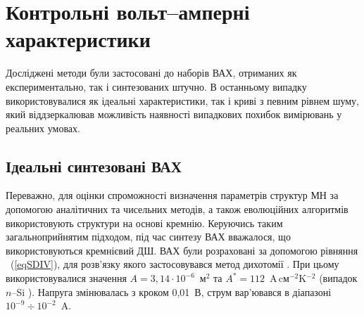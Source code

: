 \section{Контрольні вольт--амперні характеристики}
Досліджені методи були застосовані до наборів ВАХ, отриманих як експериментально, так і синтезованих штучно.
В останньому випадку використовувалися як ідеальні характеристики, так і криві з певним рівнем шуму, який віддзеркалював можливість наявності випадкових похибок вимірювань у реальних умовах.

\subsection{Ідеальні синтезовані ВАХ\label{SubData}}
Переважно, для оцінки спроможності визначення параметрів структур МН за допомогою аналітичних \cite{Norde,Lien,Werner,Gromov,Lee,Bohlin,Cibils,Mikhelashvili,Kaminski} та чисельних \cite{Evangelou,Donoval} методів, а також еволюційних алгоритмів \cite{PSO_Ye,P-DE_Ishaque,TLBO_Patel} використовують структури на основі кремнію.
Керуючись таким загальноприйнятим підходом, під час синтезу ВАХ вважалося, що використовуються кремнієвий ДШ.
ВАХ були розраховані за допомогою рівняння ~(\ref{eqSDIV}), для розв'язку якого застосовувався метод дихотомії \cite[с.~158]{KalitkinBook}.
При цьому використовувалися значення $A=3,14\cdot10^{-6}$~м$^2$ та $A^*=112$~A$\,$cм$^{-2}$K$^{-2}$ (випадок $n$--Si \cite{Schroder2006}).
Напруга змінювалась з кроком 0,01~В, струм вар'ювався в діапазоні $10^{-9}\div10^{-2}$~A.

